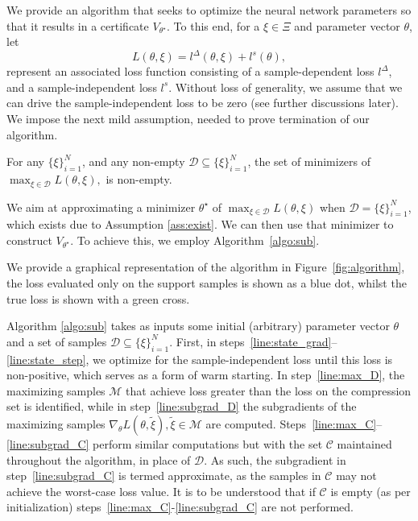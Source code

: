 We provide an algorithm that seeks to optimize the neural network parameters so that it results in a certificate $V_{\theta^\star}$. 
To this end, for a $\xi \in \Xi$ and parameter vector $\theta$, let \begin{equation}
    L(\theta,\xi)=l^\Delta(\theta,\xi)+ l^s(\theta),\label{eq:opt_prob}
\end{equation} represent an associated loss function consisting of a sample-dependent loss $l^\Delta$, and a sample-independent loss $l^s$. 
Without loss of generality, we assume that we can drive the sample-independent loss to be zero (see further discussions later). 
We impose the next mild assumption, needed to prove termination of our algorithm.
\begin{assum} \label{ass:exist}
For any $\{\xi\}_{i=1}^N$, and any non-empty $\mathcal{D} \subseteq \{\xi\}_{i=1}^N$, the set of minimizers of $\max_{\xi \in \mathcal{D}} L(\theta,\xi),$ is non-empty.
\end{assum}
We aim at approximating a minimizer $\theta^\star$ of $\max_{\xi \in \mathcal{D}} L(\theta,\xi)$ when $\mathcal{D}=\{\xi\}_{i=1}^N$, which exists due to Assumption \ref{ass:exist}. 
We can then use that minimizer to construct $V_{\theta^\star}$. 
To achieve this, we employ Algorithm~\ref{algo:sub}. 

We provide a graphical representation of the algorithm in Figure~\ref{fig:algorithm}, the loss evaluated only on the support samples is shown as a blue dot, whilst the true loss is shown with a green cross.

Algorithm \ref{algo:sub} takes as inputs some initial (arbitrary) parameter vector $\theta$ and a set of samples $\mathcal{D} \subseteq \{\xi\}_{i=1}^N$. 
First, in steps~\ref{line:state_grad}--\ref{line:state_step}, we optimize for the sample-independent loss until this loss is non-positive, which serves as a form of warm starting.
In step~\ref{line:max_D}, the maximizing samples $\mathcal{M}$ that achieve loss greater than the loss on the compression set is identified, while in step~\ref{line:subgrad_D} the subgradients of the maximizing samples $\nabla_\theta L(\theta,\tilde{\xi}), \tilde{\xi} \in \mathcal{M}$ are computed.  
Steps~\ref{line:max_C}--\ref{line:subgrad_C} perform similar computations but with the set $\mathcal{C}$ maintained throughout the algorithm, in place of $\mathcal{D}$. 
As such, the subgradient in step~\ref{line:subgrad_C} is termed approximate, as the samples in $\mathcal{C}$ may not achieve the worst-case loss value. 
It is to be understood that if $\mathcal{C}$ is empty (as per initialization) steps~\ref{line:max_C}-\ref{line:subgrad_C} are not performed.

